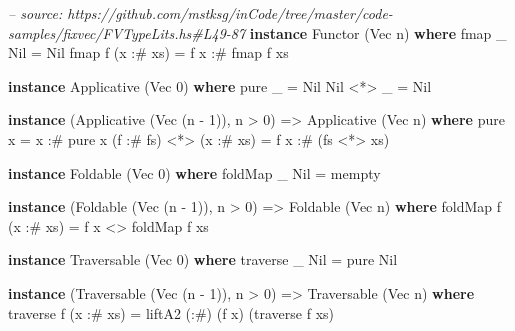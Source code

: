 \documentclass[]{article}
\newenvironment{Shaded}{\begin{snugshade}}{\end{snugshade}}
\newcommand{\CommentTok}[1]{\textcolor[rgb]{0.56,0.35,0.01}{\textit{#1}}}
\newcommand{\DataTypeTok}[1]{\textcolor[rgb]{0.13,0.29,0.53}{#1}}
\newcommand{\DecValTok}[1]{\textcolor[rgb]{0.00,0.00,0.81}{#1}}
\newcommand{\FunctionTok}[1]{\textcolor[rgb]{0.00,0.00,0.00}{#1}}
\newcommand{\KeywordTok}[1]{\textcolor[rgb]{0.13,0.29,0.53}{\textbf{#1}}}
\newcommand{\NormalTok}[1]{#1}
\newcommand{\OtherTok}[1]{\textcolor[rgb]{0.56,0.35,0.01}{#1}}
\begin{document}
\begin{Shaded}
\begin{Highlighting}[]
\CommentTok{-- source: https://github.com/mstksg/inCode/tree/master/code-samples/fixvec/FVTypeLits.hs#L49-87}
\KeywordTok{instance} \DataTypeTok{Functor}\NormalTok{ (}\DataTypeTok{Vec}\NormalTok{ n) }\KeywordTok{where}
\NormalTok{    fmap _ }\DataTypeTok{Nil}       \FunctionTok{=} \DataTypeTok{Nil}
\NormalTok{    fmap f (x }\FunctionTok{:#}\NormalTok{ xs) }\FunctionTok{=}\NormalTok{ f x }\FunctionTok{:#}\NormalTok{ fmap f xs}

\KeywordTok{instance} \DataTypeTok{Applicative}\NormalTok{ (}\DataTypeTok{Vec} \DecValTok{0}\NormalTok{) }\KeywordTok{where}
\NormalTok{    pure _    }\FunctionTok{=} \DataTypeTok{Nil}
    \DataTypeTok{Nil} \FunctionTok{<*>}\NormalTok{ _ }\FunctionTok{=} \DataTypeTok{Nil}

\KeywordTok{instance}\NormalTok{ (}\DataTypeTok{Applicative}\NormalTok{ (}\DataTypeTok{Vec}\NormalTok{ (n }\FunctionTok{-} \DecValTok{1}\NormalTok{)), n }\FunctionTok{>} \DecValTok{0}\NormalTok{) }\OtherTok{=>} \DataTypeTok{Applicative}\NormalTok{ (}\DataTypeTok{Vec}\NormalTok{ n) }\KeywordTok{where}
\NormalTok{    pure x }\FunctionTok{=}\NormalTok{ x }\FunctionTok{:#}\NormalTok{ pure x}
\NormalTok{    (f }\FunctionTok{:#}\NormalTok{ fs) }\FunctionTok{<*>}\NormalTok{ (x }\FunctionTok{:#}\NormalTok{ xs) }\FunctionTok{=}\NormalTok{ f x }\FunctionTok{:#}\NormalTok{ (fs }\FunctionTok{<*>}\NormalTok{ xs)}

\KeywordTok{instance} \DataTypeTok{Foldable}\NormalTok{ (}\DataTypeTok{Vec} \DecValTok{0}\NormalTok{) }\KeywordTok{where}
\NormalTok{    foldMap _ }\DataTypeTok{Nil} \FunctionTok{=}\NormalTok{ mempty}

\KeywordTok{instance}\NormalTok{ (}\DataTypeTok{Foldable}\NormalTok{ (}\DataTypeTok{Vec}\NormalTok{ (n }\FunctionTok{-} \DecValTok{1}\NormalTok{)), n }\FunctionTok{>} \DecValTok{0}\NormalTok{) }\OtherTok{=>} \DataTypeTok{Foldable}\NormalTok{ (}\DataTypeTok{Vec}\NormalTok{ n) }\KeywordTok{where}
\NormalTok{    foldMap f (x }\FunctionTok{:#}\NormalTok{ xs) }\FunctionTok{=}\NormalTok{ f x }\FunctionTok{<>}\NormalTok{ foldMap f xs}

\KeywordTok{instance} \DataTypeTok{Traversable}\NormalTok{ (}\DataTypeTok{Vec} \DecValTok{0}\NormalTok{) }\KeywordTok{where}
\NormalTok{    traverse _ }\DataTypeTok{Nil} \FunctionTok{=}\NormalTok{ pure }\DataTypeTok{Nil}

\KeywordTok{instance}\NormalTok{ (}\DataTypeTok{Traversable}\NormalTok{ (}\DataTypeTok{Vec}\NormalTok{ (n }\FunctionTok{-} \DecValTok{1}\NormalTok{)), n }\FunctionTok{>} \DecValTok{0}\NormalTok{) }\OtherTok{=>} \DataTypeTok{Traversable}\NormalTok{ (}\DataTypeTok{Vec}\NormalTok{ n) }\KeywordTok{where}
\NormalTok{    traverse f (x }\FunctionTok{:#}\NormalTok{ xs) }\FunctionTok{=}\NormalTok{ liftA2 (}\FunctionTok{:#}\NormalTok{) (f x) (traverse f xs)}


\end{Highlighting}
\end{Shaded}
\end{document}
